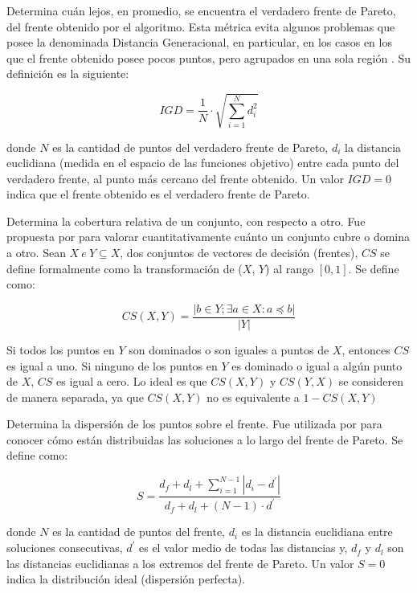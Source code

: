       \begin{definicion} 
      Determina cu\'an lejos, en promedio, se encuentra el verdadero frente de Pareto, del frente obtenido por el algoritmo.
      Esta m\'etrica evita algunos problemas que posee la denominada Distancia Generacional, en particular, en los casos en 
      los que el frente obtenido posee pocos puntos, pero agrupados en una sola regi\'on \cite{Veldhuizen98}. 
      Su definici\'on es la siguiente:

      \[
	IGD = \frac{1}{N} \cdot \sqrt{\sum^{N}_{i=1}{d^2_i}}
      \]
      
      donde $N$ es la cantidad de puntos del verdadero frente de Pareto, $d_i$ la distancia euclidiana (medida en el espacio 
      de las funciones objetivo) entre cada punto del verdadero frente, al punto m\'as cercano del frente obtenido. Un valor 
      $IGD = 0$ indica que el frente obtenido es el verdadero frente de Pareto.

      \end{definicion}
  
      \begin{definicion}
	  Determina la cobertura relativa de un conjunto, con respecto a otro. Fue propuesta por \cite{Zitzler2000} para 
	  valorar cuantitativamente cu\'anto un conjunto cubre o domina a otro. Sean $X \ e \ Y \subseteq X$, dos conjuntos de 
	  vectores de decisi\'on (frentes), $CS$ se define formalmente como la transformaci\'on de ($X$, $Y$) al rango 
	  $[0,1]$. Se define como:

	  \[CS\left(X, Y \right) = \frac{|b \in Y; \exists a \in X: a\preceq b|}{|Y|}\]
	  
	  Si todos los puntos en $Y$ son dominados o son iguales a puntos de $X$, entonces $CS$ es igual a uno. Si ninguno de los 
	  puntos en $Y$ es dominado o igual a alg\'un punto de $X$, $CS$ es igual a cero. Lo ideal es que $CS \left(X, Y\right)$ 
	  y $CS \left(Y, X \right)$ se consideren de manera separada, ya que $CS \left(X, Y\right)$ no es equivalente a
	  $1- CS \left(X, Y\right)$
      \end{definicion}
      
      \begin{definicion}
	 Determina la dispersi\'on de los puntos sobre el frente. Fue utilizada por \cite{deb02} para conocer 
	 c\'omo est\'an distribuidas las soluciones a lo largo del frente de Pareto. Se define como:
	 
	 \[S= \frac{d_f + d_l + \sum^{N-1}_{i=1}{|d_i-d^{'}|}}{d_f + d_l + \left(N -1\right)\cdot d^{'}}\]
  
      donde $N$ es la cantidad de puntos del frente, $d_i$ es la distancia euclidiana entre soluciones consecutivas, 
      $d^{'}$ es el valor medio de todas las distancias y, $d_f$ y $d_l$ son las distancias euclidianas a los extremos 
      del frente de Pareto. Un valor $S = 0$ indica la distribuci\'on ideal (dispersi\'on perfecta).
      \end{definicion}   
      
